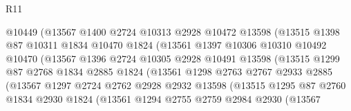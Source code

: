 \begin{lexlean}{R11}
\begin{coremodule}
                          @10449
                          (@13567
                            @1400
                            @2724
                            @10313
                            @2928
                            @10472
                            @13598
                            (@13515
                              @1398
                              @87
                              @10311
                              @1834
                              @10470
                              @1824
                              (@13561
                                @1397
                                @10306
                                @10310
                                @10492
                                @10470
                                (@13567
                                  @1396
                                  @2724
                                  @10305
                                  @2928
                                  @10491
                                  @13598
                                  (@13515
                                    @1299
                                    @87
                                    @2768
                                    @1834
                                    @2885
                                    @1824
                                    (@13561
                                      @1298
                                      @2763
                                      @2767
                                      @2933
                                      @2885
                                      (@13567
                                        @1297
                                        @2724
                                        @2762
                                        @2928
                                        @2932
                                        @13598
                                        (@13515
                                          @1295
                                          @87
                                          @2760
                                          @1834
                                          @2930
                                          @1824
                                          (@13561
                                            @1294
                                            @2755
                                            @2759
                                            @2984
                                            @2930
                                            (@13567

\end{coremodule}
\end{lexlean}
